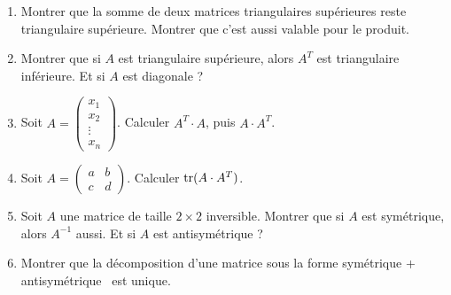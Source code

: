 \begin{frame}

\begin{miniexercice}
\begin{enumerate}
  \item Montrer que la somme de deux matrices triangulaires supérieures reste triangulaire supérieure.
  Montrer que c'est aussi valable pour le produit.
  
  \item Montrer que si $A$ est triangulaire supérieure, alors $A^T$ est triangulaire inférieure.
  Et si $A$ est diagonale ?
  
  \item Soit $A = \left(\begin{smallmatrix}x_1 \\ x_2 \\ \vdots \\ x_n \end{smallmatrix} \right)$.
  Calculer $A^T \cdot A$, puis $A\cdot A^T$.
        
  \item Soit $A=\left(\begin{smallmatrix}a&b\\c&d\end{smallmatrix}\right)$. 
  Calculer $\mathop{\text{tr}}\nolimits(A\cdot A^T)$.
  
  \item Soit $A$ une matrice de taille $2\times 2$ inversible. Montrer
  que si $A$ est symétrique, alors $A^{-1}$ aussi. Et si $A$ est antisymétrique ?
  
  \item Montrer que la décomposition d'une matrice sous la forme
  \og symétrique + antisymétrique \fg\ est unique.

\end{enumerate}
\end{miniexercice}

\end{frame}

